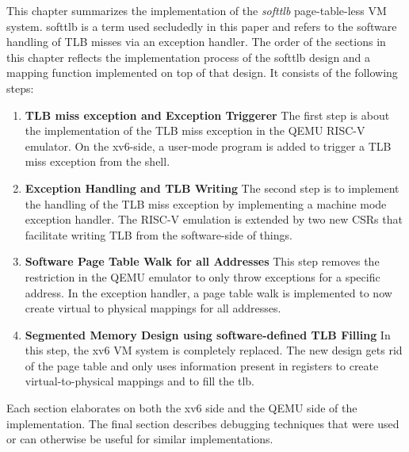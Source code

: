 This chapter summarizes the implementation of the \textit{softtlb} page-table-less VM system. softtlb is a term used secludedly in this paper and refers to the software handling of TLB misses via an exception handler.
The order of the sections in this chapter reflects the implementation process of the softtlb design and a mapping function implemented on top of that design. It consists of the following steps:
\begin{enumerate}
    \item \textbf{TLB miss exception and Exception Triggerer} The first step is about
          the implementation of the TLB miss exception in the QEMU RISC-V emulator. On the xv6-side,
          a user-mode program is added to trigger a TLB miss exception from the shell.
    \item \textbf{Exception Handling and TLB Writing} The second step is to implement the
          handling of the TLB miss exception by implementing a machine mode exception handler.
          The RISC-V emulation is extended by two new CSRs that facilitate writing TLB from the
          software-side of things.
    \item \textbf{Software Page Table Walk for all Addresses} This step removes the restriction
          in the QEMU emulator to only throw exceptions for a specific address. In the exception handler,
          a page table walk is implemented to now create virtual to physical mappings for all addresses.
    \item \textbf{Segmented Memory Design using software-defined TLB Filling} In this step, the xv6 VM system is completely
          replaced. The new design gets rid of the page table and only uses information present in
          registers to create virtual-to-physical mappings and to fill the tlb.
\end{enumerate}
Each section elaborates on both the xv6 side and the QEMU side of the implementation.
The final section describes debugging techniques that were used or can otherwise be useful for
similar implementations.

